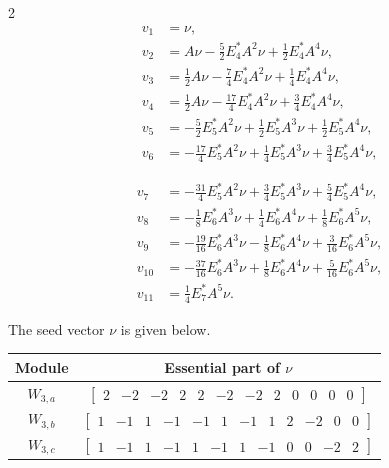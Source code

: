 \documentclass[12pt,letterpaper]{article}
\newcommand{\rowvector}[1]{\begin{bmatrix} #1 \end{bmatrix}}
\begin{document}
\vspace{-0.7cm}
\begin{multicols}{2}
\begin{align*}
v_1 &= \nu, \\
v_2 &= A\nu - \tfrac{5}{2}E_4^*A^2\nu + \tfrac{1}{2}E_4^*A^4\nu, \\
v_3 &= \tfrac{1}{2}A\nu - \tfrac{7}{4}E_4^*A^2\nu + \tfrac{1}{4}E_4^*A^4\nu, \\
v_4 &= \tfrac{1}{2}A\nu - \tfrac{17}{4}E_4^*A^2\nu + \tfrac{3}{4}E_4^*A^4\nu, \\
v_5 &= -\tfrac{5}{2}E_5^*A^2\nu + \tfrac{1}{2}E_5^*A^3\nu + \tfrac{1}{2}E_5^*A^4\nu, \\
v_6 &= -\tfrac{17}{4}E_5^*A^2\nu + \tfrac{1}{4}E_5^*A^3\nu + \tfrac{3}{4}E_5^*A^4\nu,
\end{align*}
 
\columnbreak
 
\begin{align*}
v_7 &= -\tfrac{31}{4}E_5^*A^2\nu + \tfrac{3}{4}E_5^*A^3\nu + \tfrac{5}{4}E_5^*A^4\nu, \\
v_8 &= -\tfrac{1}{8}E_6^*A^3\nu + \tfrac{1}{4}E_6^*A^4\nu + \tfrac{1}{8}E_6^*A^5\nu, \\
v_9 &= -\tfrac{19}{16}E_6^*A^3\nu - \tfrac{1}{8}E_6^*A^4\nu + \tfrac{3}{16}E_6^*A^5\nu, \\
v_{10} &= -\tfrac{37}{16}E_6^*A^3\nu + \tfrac{1}{8}E_6^*A^4\nu + \tfrac{5}{16}E_6^*A^5\nu, \\
v_{11} &= \tfrac{1}{4}E_7^*A^5\nu.
\end{align*}
\end{multicols}
The seed vector $\nu$ is given below.

\begin{center}
    \begin{tabular}{c | c}
    \toprule
       \textbf{Module}  & \textbf {Essential part of }$\nu$ \\
       \midrule
       $W_{3,a}$  & $\rowvector{2 & -2 & -2 & 2 & 2 & -2 & -2 & 2 & 0 & 0 & 0 & 0}$ \\[1.67pt]
       $W_{3,b}$  & $\rowvector{1 & -1 & 1 & -1 & -1 & 1 & -1 & 1 & 2 & -2 & 0 & 0}$ \\[1.67pt]
       $W_{3,c}$ & $\rowvector{1 & -1 & 1 & -1 & 1 & -1 & 1 & -1 & 0 & 0 & -2 & 2}$ \\
    \bottomrule
    \end{tabular}
\end{center}
\end{document}
